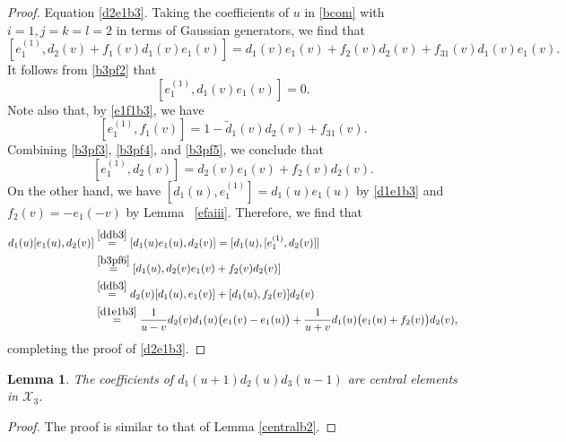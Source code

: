 \documentclass[11pt,reqno]{amsart}
\newcommand{\mybox}{%
    \collectbox{%
        \setlength{\fboxsep}{1pt}%
        \fbox{\BOXCONTENT}%
    }%
}
\numberwithin{equation}{section}
\newtheorem{lem}[thm]{Lemma}
\newtheorem{cor}[thm]{Corollary}
\theoremstyle{definition}
\theoremstyle{remark}
\newcommand{\beq}{\begin{equation}}
\newcommand{\eeq}{\end{equation}}
\newcommand{\tl}{\tilde}
\newcommand{\scrX}{{\mathscr{X}}}
\begin{document}
\begin{proof}
\mybox{Equation \eqref{d2e1b3}}. Taking the coefficients of $u$ in \eqref{bcom} with $i=1,j=k=l=2$ in terms of Gaussian generators, we find that
\beq\label{b3pf3}
[e_1^{(1)},d_2(v)+f_1(v)d_1(v)e_1(v)]=d_1(v)e_1(v)+f_2(v)d_2(v)+f_{31}(v)d_1(v)e_1(v).
\eeq
It follows from \eqref{b3pf2} that 
\beq\label{b3pf4}
[e_1^{(1)},d_1(v)e_1(v)]=0.
\eeq
Note also that, by \eqref{e1f1b3}, we have
\beq\label{b3pf5}
[e_1^{(1)},f_1(v)]=1-\tl d_1(v)d_2(v)+f_{31}(v).
\eeq
Combining \eqref{b3pf3}, \eqref{b3pf4}, and \eqref{b3pf5}, we conclude that
\beq\label{b3pf6}
[e_1^{(1)},d_2(v)]=d_2(v)e_1(v)+f_2(v)d_2(v).
\eeq
On the other hand, we have $[d_1(u),e_1^{(1)}]=d_1(u)e_1(u)$ by \eqref{d1e1b3} and $f_2(v)=-e_1(-v)$ by Lemma~ \ref{efaiii}. Therefore, we find that
\begin{align*}
d_1(u)[e_1(u),d_2(v)]&\stackrel{\eqref{ddb3}}{=}[d_1(u)e_1(u),d_2(v)]=[d_1(u),[e_1^{(1)},d_2(v)]]\\
&\stackrel{\eqref{b3pf6}}{=}[d_1(u),d_2(v)e_1(v)+f_2(v)d_2(v)]\\
&\stackrel{\eqref{ddb3}}{=}d_2(v)[d_1(u),e_1(v)]+[d_1(u),f_2(v)]d_2(v)\\
&\stackrel{\eqref{d1e1b3}}{=}\frac{1}{u-v}d_2(v)d_1(u)\big(e_1(v)-e_1(u)\big)+\frac{1}{u+v}d_1(u)\big(e_1(u)+f_2(v)\big)d_2(v),
\end{align*}
completing the proof of \eqref{d2e1b3}.
\end{proof}

\begin{lem}\label{centralb3}
The coefficients of $d_1(u+1)d_2(u)d_3(u-1)$ are central elements in $\scrX_3$.
\end{lem}
\begin{proof}
The proof is similar to that of Lemma \ref{centralb2}.
\end{proof}

\end{document}
